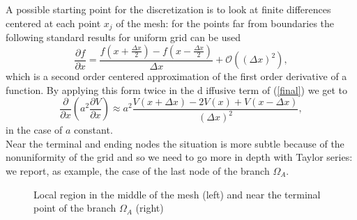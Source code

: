 \documentclass[a4paper,11pt ]{report}
\theoremstyle{definition}
\begin{document}
A possible starting point for the discretization is to look at finite differences centered at each point $x_j$ of the mesh: for the points far from boundaries the following standard results for uniform grid can be used
\begin{equation*}
\frac{\partial f}{\partial x}=\frac{f(x+\frac{\Delta x}{2})-f(x-\frac{\Delta x}{2})}{\Delta x}+\mathcal{O}((\Delta x)^2),
\end{equation*}
which is a second order centered approximation of the first order derivative of a function. By applying this form twice in the d\printbibliography
iffusive term of (\ref{final}) we get to 
\begin{equation*}
\frac{\partial}{\partial x}\left( a^2 \frac{\partial V}{\partial x}\right)\approx a^2\frac{V(x+\Delta x)-2V(x)+V(x-\Delta x)}{(\Delta x)^2},
\end{equation*}
in the case of $a$ constant.\\
Near the terminal and ending nodes the situation is more subtle because of the nonuniformity of the grid and so we need to go more in depth with Taylor series: we report, as example, the case of the last node of the branch $\Omega_A$.\\ 
\begin{figure}[h!]
\centering
{}
\caption{Local region in the middle of the mesh (left) and near the terminal point of the branch $\Omega_A$ (right)}
\end{figure}
\end{document}
